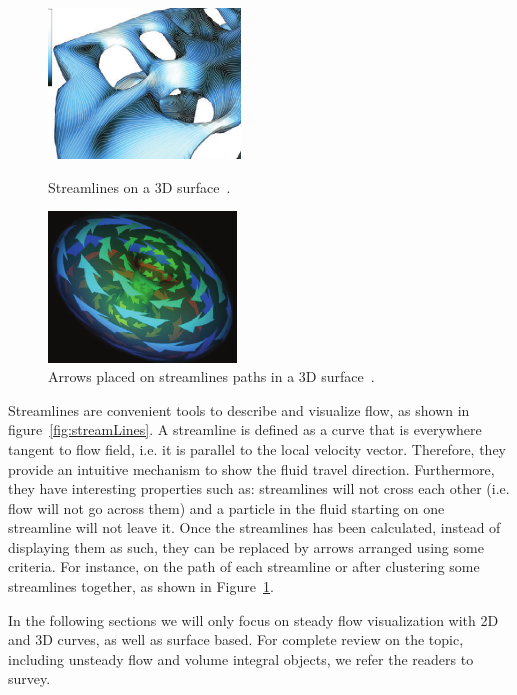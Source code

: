 \begin{figure}[htbp]
	\centering
	\begin{minipage}[t]{.45\textwidth}
		\centering
		\includegraphics[width=.8\textwidth,height=4cm]{images/streamLinesSpencer}
		\caption{Streamlines on a 3D surface~\cite{Spencer2009}.}
		\label{fig:streamLines}
	\end{minipage}\hfill
	\begin{minipage}[t]{.45\textwidth}
		\centering
		\includegraphics[width=.8\textwidth,height=4cm]{images/streamArrows}
		\caption{Arrows placed on streamlines paths in a 3D surface~\cite{loffelmann1998}.}
		\label{fig:streamArrows}
	\end{minipage}
\end{figure}

Streamlines are convenient tools to describe and visualize flow, as shown in figure~\ref{fig:streamLines}.
A streamline is defined as a curve that is everywhere tangent to flow field, i.e. it is parallel to the local velocity vector.
Therefore, they provide an intuitive mechanism to show the fluid travel direction.
Furthermore, they have interesting properties such as: streamlines will not cross each other (i.e. flow will not go across them) and a particle in the fluid starting on one streamline will not leave it.
Once the streamlines has been calculated, instead of displaying them as such, they can be replaced by arrows arranged using some criteria.
For instance, on the path of each streamline or after clustering some streamlines together, as shown in Figure~\ref{fig:streamArrows}.

In the following sections we will only focus on steady flow visualization with 2D and 3D curves, as well as surface based.
For complete review on the topic, including unsteady flow and volume integral objects, we refer the readers to~\cite{McLoughlin2010} survey.

